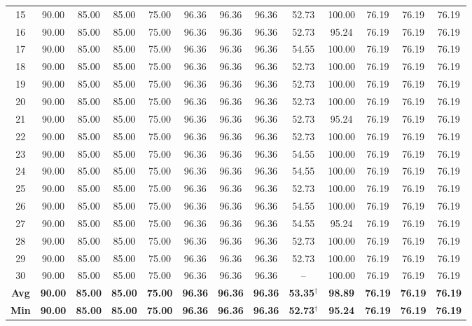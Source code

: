 \begin{table}
{\begin{tabular}{|c|cccc|cccc|cccc|}
15 & 90.00 & 85.00 & 85.00 & 75.00 & 96.36 & 96.36 & 96.36 & 52.73 & 100.00 & 76.19 & 76.19 & 76.19 \\
16 & 90.00 & 85.00 & 85.00 & 75.00 & 96.36 & 96.36 & 96.36 & 52.73 & 95.24 & 76.19 & 76.19 & 76.19 \\
17 & 90.00 & 85.00 & 85.00 & 75.00 & 96.36 & 96.36 & 96.36 & 54.55 & 100.00 & 76.19 & 76.19 & 76.19 \\
18 & 90.00 & 85.00 & 85.00 & 75.00 & 96.36 & 96.36 & 96.36 & 52.73 & 100.00 & 76.19 & 76.19 & 76.19 \\
19 & 90.00 & 85.00 & 85.00 & 75.00 & 96.36 & 96.36 & 96.36 & 52.73 & 100.00 & 76.19 & 76.19 & 76.19 \\
20 & 90.00 & 85.00 & 85.00 & 75.00 & 96.36 & 96.36 & 96.36 & 52.73 & 100.00 & 76.19 & 76.19 & 76.19 \\
21 & 90.00 & 85.00 & 85.00 & 75.00 & 96.36 & 96.36 & 96.36 & 52.73 & 95.24 & 76.19 & 76.19 & 76.19 \\
22 & 90.00 & 85.00 & 85.00 & 75.00 & 96.36 & 96.36 & 96.36 & 52.73 & 100.00 & 76.19 & 76.19 & 76.19 \\
23 & 90.00 & 85.00 & 85.00 & 75.00 & 96.36 & 96.36 & 96.36 & 54.55 & 100.00 & 76.19 & 76.19 & 76.19 \\
24 & 90.00 & 85.00 & 85.00 & 75.00 & 96.36 & 96.36 & 96.36 & 54.55 & 100.00 & 76.19 & 76.19 & 76.19 \\
25 & 90.00 & 85.00 & 85.00 & 75.00 & 96.36 & 96.36 & 96.36 & 52.73 & 100.00 & 76.19 & 76.19 & 76.19 \\
26 & 90.00 & 85.00 & 85.00 & 75.00 & 96.36 & 96.36 & 96.36 & 54.55 & 100.00 & 76.19 & 76.19 & 76.19 \\
27 & 90.00 & 85.00 & 85.00 & 75.00 & 96.36 & 96.36 & 96.36 & 54.55 & 95.24 & 76.19 & 76.19 & 76.19 \\
28 & 90.00 & 85.00 & 85.00 & 75.00 & 96.36 & 96.36 & 96.36 & 52.73 & 100.00 & 76.19 & 76.19 & 76.19 \\
29 & 90.00 & 85.00 & 85.00 & 75.00 & 96.36 & 96.36 & 96.36 & 52.73 & 100.00 & 76.19 & 76.19 & 76.19 \\
30 & 90.00 & 85.00 & 85.00 & 75.00 & 96.36 & 96.36 & 96.36 & -- & 100.00 & 76.19 & 76.19 & 76.19 \\
\hline
\textbf{Avg} & \textbf{90.00} & \textbf{85.00} & \textbf{85.00} & \textbf{75.00} & \textbf{96.36} & \textbf{96.36} & \textbf{96.36} & \textbf{53.35}$^{\dagger}$ & \textbf{98.89} & \textbf{76.19} & \textbf{76.19} & \textbf{76.19} \\
\textbf{Min} & \textbf{90.00} & \textbf{85.00} & \textbf{85.00} & \textbf{75.00} & \textbf{96.36} & \textbf{96.36} & \textbf{96.36} & \textbf{52.73}$^{\dagger}$ & \textbf{95.24} & \textbf{76.19} & \textbf{76.19} & \textbf{76.19} \\

\end{tabular}}
\end{table}

